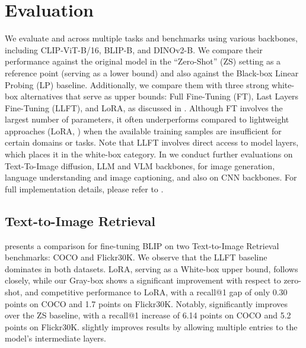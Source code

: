\section{Evaluation}
\label{sec:evaluation}

We evaluate \ours and \oursp across multiple tasks and benchmarks using various backbones, including CLIP-ViT-B/16, BLIP-B, and DINOv2-B. We compare their performance against the original model in the ``Zero-Shot'' (ZS) setting as a reference point (serving as a lower bound) and also against the Black-box Linear Probing (LP) baseline. Additionally, we compare them with three strong white-box alternatives that serve as upper bounds: Full Fine-Tuning (FT), Last Layers Fine-Tuning (LLFT), and LoRA, as discussed in .
Although FT involves the largest number of parameters, it often underperforms compared to lightweight approaches (\eg LoRA, \ours) when the available training samples are insufficient for certain domains or tasks. Note that LLFT involves direct access to model layers, which places it in the white-box category. In  we conduct further evaluations on Text-To-Image diffusion, LLM and VLM backbones, for image generation, language understanding and image captioning, and also on CNN backbones.
For full implementation details, please refer to . %


\subsection{Text-to-Image Retrieval}

 presents a comparison for fine-tuning BLIP on two Text-to-Image Retrieval benchmarks: COCO and Flickr30K. We observe that the LLFT baseline dominates in both datasets. LoRA, serving as a White-box upper bound, follows closely, while our Gray-box \ours shows a significant improvement with respect to zero-shot, and competitive performance to LoRA, with a recall@1 gap of only 0.30 points on COCO and 1.7 points on Flickr30K. Notably, \ours significantly improves over the ZS baseline, with a recall@1 increase of 6.14 points on COCO and 5.2 points on Flickr30K. \oursp slightly improves \ours results by allowing multiple entries to the model's intermediate layers. 

% 

